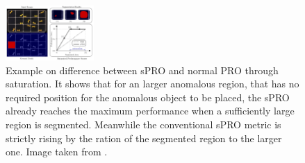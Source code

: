 \begin{figure}[ht]
    \centering
    \includegraphics[width=0.3\textwidth]{figures/spro_vs_pro_bergmann.png}
    \caption{Example on difference between sPRO and normal PRO through saturation. It shows that for an larger anomalous region, that has no required 
             position for the anomalous object to be placed, the sPRO already reaches the maximum performance when a sufficiently large 
             region is segmented. Meanwhile the conventional sPRO metric is strictly rising by the ration of the segmented region to the larger one.
             Image taken from \cite{LOCODentsAndScratchesBergmann2022}.}
    \label{fig:sprovspro}
\end{figure}



